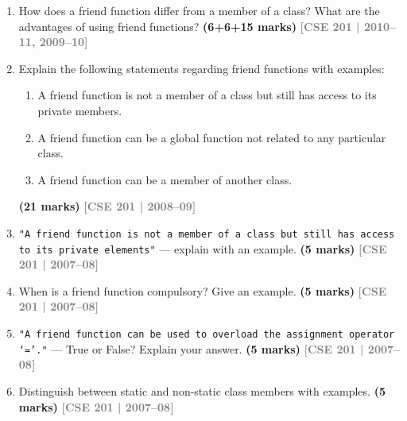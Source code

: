 \documentclass[12pt,a3paper]{article}
\newcommand{\yr}[1]{\hfill\textcolor{gray}{\small\textbf{[#1]}}}
\newcommand{\mk}[1]{\textcolor{orange!70!black}{\small\textbf{(#1 marks)}}}
\begin{document}
\begin{enumerate}
\item How does a friend function differ from a member of a class? What are the advantages of using friend functions? \mk{6+6+15}
\yr{CSE 201 | 2010--11, 2009--10}




\item Explain the following statements regarding friend functions with examples:
\begin{enumerate}
  \item A friend function is not a member of a class but still has access to its private members.
  \item A friend function can be a global function not related to any particular class.
  \item A friend function can be a member of another class.
\end{enumerate}
\mk{21}
\yr{CSE 201 | 2008--09}






\item \texttt{"A friend function is not a member of a class but still has access to its private elements"} --- explain with an example. \mk{5}
\yr{CSE 201 | 2007--08}

\item When is a friend function compulsory? Give an example. \mk{5}
\yr{CSE 201 | 2007--08}






\item \texttt{"A friend function can be used to overload the assignment operator `='."} --- True or False? Explain your answer. \mk{5}
\yr{CSE 201 | 2007--08}





\item Distinguish between static and non-static class members with examples. \mk{5}
\yr{CSE 201 | 2007--08}







\end{enumerate}
\newpage
\end{document}
